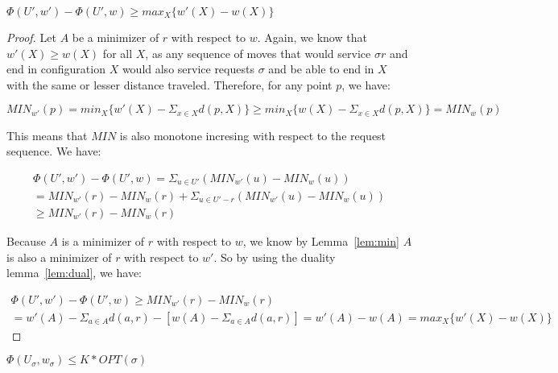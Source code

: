 \begin{lemma}
    \label{lem:ep2}
    $\Phi(U', w') - \Phi(U', w) \geq max_X \{ w'(X) - w(X)\}$
\end{lemma}

\begin{proof}
    Let $A$ be a minimizer of $r$ with respect to $w$. Again, we know that $w'(X) \geq w(X)$ for all $X$, as any sequence of moves that would service $\sigma r$ and end in configuration $X$ would also service requests $\sigma$ and be able to end in $X$ with the same or lesser distance traveled. Therefore, for any point $p$, we have: 

    \begin{equation*}
        MIN_{w'}(p) = min_{X} \{w'(X) - \Sigma_{x \in X} d(p,X) \} \geq min_{X} \{w(X) - \Sigma_{x \in X} d(p,X)  \} = MIN_w(p)
    \end{equation*}

    This means that $MIN$ is also monotone incresing with respect to the request sequence. We have:

    \begin{equation*}
        \begin{gathered}
            \Phi(U', w') - \Phi(U', w) = \Sigma_{u \in U'} (MIN_{w'}(u) - MIN_w(u)) \\
            = MIN_{w'} (r) - MIN_w(r) + \Sigma_{u \in U' - r} (MIN_{w'} (u) - MIN_w(u))\\
            \geq MIN_{w'} (r) - MIN_w(r)
        \end{gathered}
    \end{equation*}

    Because $A$ is a minimizer of $r$ with respect to $w$, we know by Lemma~\ref{lem:min} $A$ is also a minimizer of $r$ with respect to $w'$. So by using the duality lemma~\ref{lem:dual}, we have:

    \begin{equation*}
        \begin{gathered}
            \Phi(U', w') - \Phi(U', w) \geq MIN_{w'} (r) - MIN_w(r) \\
            = w'(A) - \Sigma_{a \in A} d(a,r) - [w(A) - \Sigma_{a \in A} d(a,r)]
            = w'(A) - w(A) = max_X \{ w'(X) - w(X)\}
        \end{gathered}
    \end{equation*}
\end{proof}

\begin{lemma}
    \label{lem:er1}
    $\Phi(U_\sigma, w_\sigma) \leq K * OPT(\sigma)$
\end{lemma}

